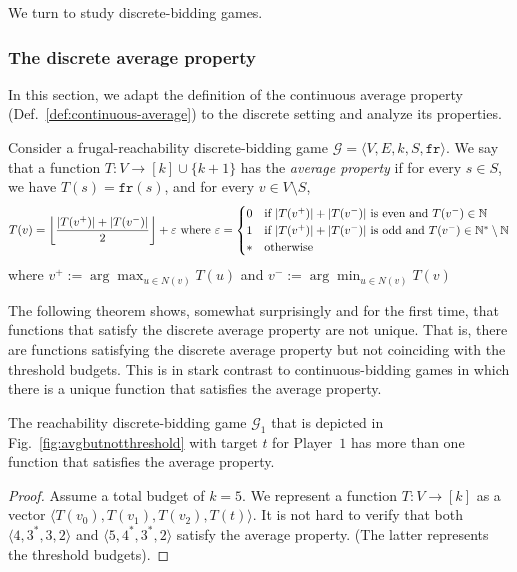 \documentclass{theoretics}
\newcommand{\PO}{Player~$1$\xspace}
\newcommand{\G}{{\mathcal G}}
\newcommand{\fr}{\texttt{fr}}
\newcommand{\Nat}{\mathbb{N}}
\newcommand{\zug}[1]{\langle #1  \rangle}
\renewcommand{\set}[1]{\{ #1  \}}
\newcommand{\eps}{\varepsilon}
\DeclarePairedDelimiter{\adjustfloor}{\lfloor}{\rfloor}
\newcommand{\floor}[1]{\adjustfloor*{#1}}
\begin{document}
We turn to study discrete-bidding games. 

\subsubsection{The discrete average property}
\label{sec:average-based-strat}

In this section, we adapt the definition of the continuous average property (Def.~\ref{def:continuous-average}) to the discrete setting and analyze its properties. 

\begin{definition}
\label{def:average}
Consider a frugal-reachability discrete-bidding game $\G = \zug{V, E, k, S, \fr}$. 
We say that a function $T: V  \rightarrow [k] \cup \set{k+1}$ has the {\em average property} if for every $s \in S$, we have $T(s) = \fr(s)$, and for every $v \in V \setminus S$, 
\[
T(v) = \floor{\frac{|T(v^+)| + |T(v^-)|}{2}} +\eps
\text{ where }
\eps = 
\begin{cases}
0 &\text{if~} |T(v^+)| + |T(v^-)| \text{ is even and~} T(v^-) \in \Nat \\
1 &\text{if~} |T(v^+)| + |T(v^-)| \text{ is odd and~} T(v^-) \in \Nat^* \setminus \Nat \\
* &\text{otherwise}
\end{cases}
\]
where $v^+ := \arg\max_{u \in N(v)} T(u)$ and $v^- := \arg\min_{u \in N(v)} T(v)$
\end{definition}



The following theorem shows, somewhat surprisingly and for the first time, that functions that satisfy the discrete average property are not unique. That is, there are functions satisfying the discrete average property but not coinciding with the threshold budgets. 
This is in stark contrast to continuous-bidding games in which there is a unique function that satisfies the average property.

\begin{theorem}
\label{thm:non-unique}
The reachability discrete-bidding game $\G_1$ that is depicted in Fig.~\ref{fig:avgbutnotthreshold} with target $t$ for \PO has more than one function that satisfies the average property. 
\end{theorem}
\begin{proof}
Assume a total budget of $k = 5$. We represent a function $T: V \rightarrow [k]$ as a vector $\zug{T(v_0), T(v_1), T(v_2), T(t)}$. It is not hard to verify that both $\zug{4,3^*,3,2}$ and $\zug{5,4^*,3^*,2}$ satisfy the average property. (The latter represents the threshold budgets). 
\end{proof}
\end{document}

